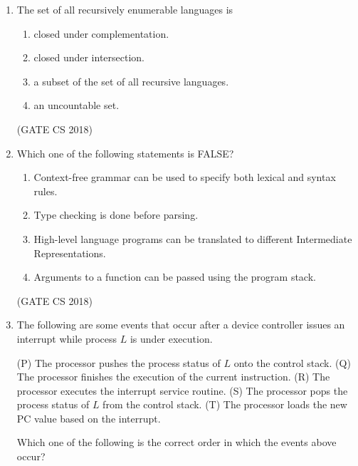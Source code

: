 \documentclass[12pt]{article}
\begin{document}
\begin{enumerate}
\begin{multicols}{4}
\begin{enumerate}
\item $k \geq 2^n$
\item $k \geq n$
\item $k \leq n^2$
\item $k \leq 2^n$
\end{enumerate}
\end{multicols}
(GATE CS 2018)

\item The set of all recursively enumerable languages is

\begin{enumerate}
\item closed under complementation.
\item closed under intersection.
\item a subset of the set of all recursive languages.
\item an uncountable set.
\end{enumerate}
(GATE CS 2018)

\item Which one of the following statements is FALSE?

\begin{enumerate}
\item Context-free grammar can be used to specify both lexical and syntax rules.
\item Type checking is done before parsing.
\item High-level language programs can be translated to different Intermediate Representations.
\item Arguments to a function can be passed using the program stack.
\end{enumerate}
(GATE CS 2018)

\item The following are some events that occur after a device controller issues an interrupt while process $L$ is under execution.  

(P) The processor pushes the process status of $L$ onto the control stack.  
(Q) The processor finishes the execution of the current instruction.  
(R) The processor executes the interrupt service routine.  
(S) The processor pops the process status of $L$ from the control stack.  
(T) The processor loads the new PC value based on the interrupt.  

Which one of the following is the correct order in which the events above occur?


\end{enumerate}
\end{document}
